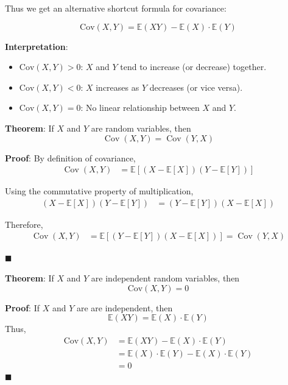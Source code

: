 \documentclass[twoside]{book}
\begin{document}
Thus we get an alternative shortcut formula for covariance:

\begin{textbox}
\[
\mathrm{Cov}(X, Y) = \mathbb{E}(XY) - \mathbb{E}(X) \cdot \mathbb{E}(Y)
\]
\end{textbox}

\textbf{Interpretation}:

\begin{itemize}
  \item \( \mathrm{Cov}(X, Y) > 0 \): \( X \) and \( Y \) tend to increase (or decrease) together.
  \item \( \mathrm{Cov}(X, Y) < 0 \): \( X \) increases as \( Y \) decreases (or vice versa).
  \item \( \mathrm{Cov}(X, Y) = 0 \): No linear relationship between \( X \) and \( Y \).
\end{itemize}

\begin{textbox}
\textbf{Theorem}: If $X$ and $Y$ are random variables, then
\[
\operatorname{Cov}(X, Y) = \operatorname{Cov}(Y, X)
\]
\end{textbox}


\textbf{Proof}: By definition of covariance,
\begin{align*}
\operatorname{Cov}(X, Y) &= \mathbb{E}[(X - \mathbb{E}[X])(Y - \mathbb{E}[Y])]
\end{align*}

Using the commutative property of multiplication,
\begin{align*}
(X - \mathbb{E}[X])(Y - \mathbb{E}[Y]) &= (Y - \mathbb{E}[Y])(X - \mathbb{E}[X])
\end{align*}

Therefore,
\begin{align*}
\operatorname{Cov}(X, Y) &= \mathbb{E}[(Y - \mathbb{E}[Y])(X - \mathbb{E}[X])] = \operatorname{Cov}(Y, X)
\end{align*}

\hfill $\blacksquare$

\begin{textbox}
\textbf{Theorem}: If \( X \) and \( Y \) are independent random variables, then  
\[
\mathrm{Cov}(X, Y) = 0
\] 
\end{textbox}

\textbf{Proof}: If $X$ and $Y$ are are independent, then
$$\mathbb{E}(XY) = \mathbb{E}(X)\cdot \mathbb{E}(Y)$$
Thus, 
\begin{align*}
\mathrm{Cov}(X, Y) &= \mathbb{E}(XY) - \mathbb{E}(X) \cdot \mathbb{E}(Y)\\
&=\mathbb{E}(X) \cdot \mathbb{E}(Y) - \mathbb{E}(X) \cdot \mathbb{E}(Y)\\
&=0
\end{align*}
\hfill\(\blacksquare\)
\end{document}
